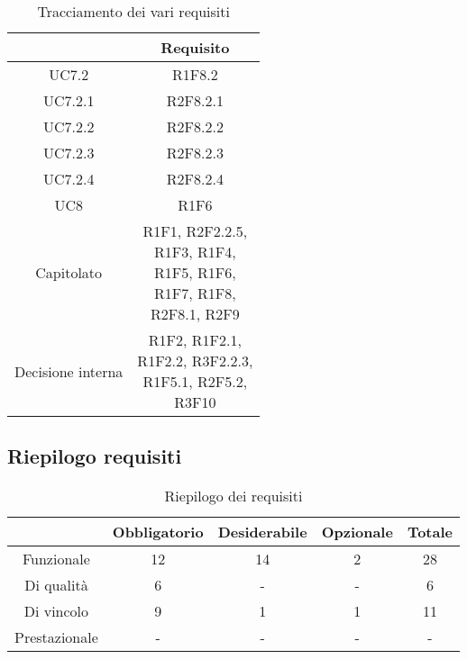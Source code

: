 \begin{table}[H]
	\centering
	\renewcommand{\arraystretch}{1.8}
	\begin{tabular}{c | c}
		\rowcolor[HTML]{125E28}
		\multicolumn{1}{c}{\color[HTML]{FFFFFF} \textbf{Fonte}} &
		\multicolumn{1}{c}{\color[HTML]{FFFFFF} \textbf{Requisito}} \\
		\hline
		UC7.2 & R1F8.2 \\ \hline
		UC7.2.1 & R2F8.2.1 \\ \hline
		UC7.2.2 & R2F8.2.2 \\ \hline
		UC7.2.3 & R2F8.2.3 \\ \hline
		UC7.2.4 & R2F8.2.4 \\ \hline
		UC8 & R1F6 \\ \hline
		Capitolato & \shortstack{R1F1, R2F2.2.5, \\R1F3, R1F4, \\R1F5, R1F6, \\R1F7, R1F8,\\ R2F8.1, R2F9}  \\ \hline
		Decisione interna & \shortstack{R1F2, R1F2.1,\\ R1F2.2, R3F2.2.3,\\ R1F5.1, R2F5.2,\\ R3F10} \\
	\end{tabular}
    \caption{Tracciamento dei vari requisiti}
\end{table}

\subsection{Riepilogo requisiti} \label{subsection: riepilogo}

\begin{table}[H]
    \centering
    \renewcommand{\arraystretch}{1.8}
    \begin{tabular}{c | c | c | c | c}
        \rowcolor[HTML]{125E28}
        \multicolumn{1}{c}{\color[HTML]{FFFFFF} \textbf{Tipologia}}     &
        \multicolumn{1}{c}{\color[HTML]{FFFFFF} \textbf{Obbligatorio}}  &
        \multicolumn{1}{c}{\color[HTML]{FFFFFF} \textbf{Desiderabile}}  &
        \multicolumn{1}{c}{\color[HTML]{FFFFFF} \textbf{Opzionale}}     &
        \multicolumn{1}{c}{\color[HTML]{FFFFFF} \textbf{Totale}}                                                                                                                                 \\
        \hline
        Funzionale & 12 & 14 & 2 & 28 \\ \hline
        Di qualità & 6 & - & - & 6 \\ \hline
        Di vincolo & 9 & 1 & 1 & 11 \\ \hline
        Prestazionale & - & - & - & - \\ 
    \end{tabular}
    \caption{Riepilogo dei requisiti}
\end{table}